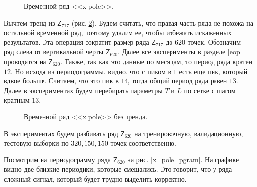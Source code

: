 \documentclass[specialist,
               substylefile = spbu.rtx,
               subf,href,colorlinks=true, 12p]{disser}
\begin{document}
\begin{figure}[H]
	\caption{Временной ряд <<x pole>>.}
	\label{x_pole}
\end{figure}

Вычтем тренд из $\mathsf{Z}_{717}$ (рис. \ref{x_pole_no_trend}). Будем считать, что правая часть ряда не похожа на остальной временной ряд, поэтому удалим ее, чтобы избежать искаженных результатов. Эта операция сократит размер ряда $\mathsf{Z}_{717}$ до $620$ точек. Обозначим ряд слева от вертикальной черты $\mathsf{Z}_{620}$. Далее все эксперименты в разделе \ref{eop} проводятся на $\mathsf{Z}_{620}$. Также, так как это данные по месяцам, то период ряда кратен $12$. Но исходя из периодограммы, видно, что с пиком в $1$ есть еще пик, который вдвое больше. Считаем, что это пик в $14$, тогда общий период ряда равен $13$. Далее в экспериментах будем перебирать параметры $T$ и $L$ по сетке с шагом кратным $13$.

\begin{figure}[H]
	\caption{Временной ряд <<x pole>> без тренда.}
	\label{x_pole_no_trend}
\end{figure}

В экспериментах будем разбивать ряд $\mathsf{Z}_{620}$ на тренировочную, валидационную, тестовую выборки по $320, 150, 150$ точек соответственно.

Посмотрим на периодограмму ряда $\mathsf{Z}_{620}$ на рис. \ref{x_pole_pgram}. На графике видно две близкие периодики, которые смешались. Это говорит, что у ряда сложный сигнал, который будет трудно выделить корректно.
\end{document}
